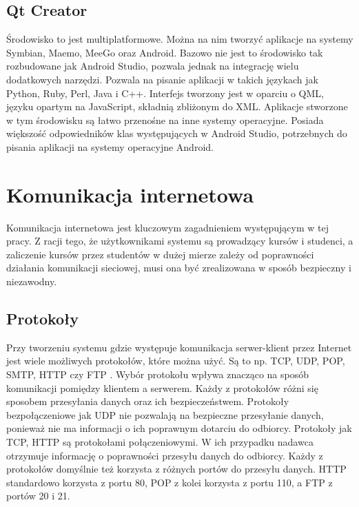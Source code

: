 \documentclass[eng]{mgr}
\begin{document}
			\subsection{Qt Creator}
			Środowisko to jest multiplatformowe. Można na nim tworzyć aplikacje na systemy Symbian, Maemo, MeeGo oraz Android. Bazowo nie jest to środowisko tak rozbudowane jak Android Studio, pozwala jednak na integrację wielu dodatkowych narzędzi. Pozwala na pisanie aplikacji w takich językach jak Python, Ruby, Perl, Java i C++. Interfejs tworzony jest w oparciu o QML, języku opartym na JavaScript, składnią zbliżonym do XML. Aplikacje stworzone w tym środowisku są łatwo przenośne na inne systemy operacyjne. Posiada większość odpowiedników klas występujących w Android Studio, potrzebnych do pisania aplikacji na systemy operacyjne Android.
	
		\section{Komunikacja internetowa}
		Komunikacja internetowa jest kluczowym zagadnieniem występującym w tej pracy. Z racji tego, że użytkownikami systemu są prowadzący kursów i studenci, a zaliczenie kursów przez studentów w dużej mierze zależy od poprawności działania komunikacji sieciowej, musi ona być zrealizowana w sposób bezpieczny i niezawodny.
		
			\subsection{Protokoły}
			Przy tworzeniu systemu gdzie występuje komunikacja serwer-klient przez Internet jest wiele możliwych protokołów, które można użyć. Są to np. TCP, UDP, POP, SMTP, HTTP czy FTP \cite{protocols}. Wybór protokołu wpływa znacząco na sposób komunikacji pomiędzy klientem a serwerem. Każdy z protokołów różni się sposobem przesyłania danych oraz ich bezpieczeństwem. Protokoły bezpołączeniowe jak UDP nie pozwalają na bezpieczne przesyłanie danych, ponieważ nie ma informacji o ich poprawnym dotarciu do odbiorcy. Protokoły jak TCP, HTTP są protokołami połączeniowymi. W ich przypadku nadawca otrzymuje informację o poprawności przesyłu danych do odbiorcy. Każdy z protokołów domyślnie też korzysta z różnych portów do przesyłu danych. HTTP standardowo korzysta z portu 80, POP z kolei korzysta z portu 110, a FTP z portów 20 i 21.
	
\end{document}
